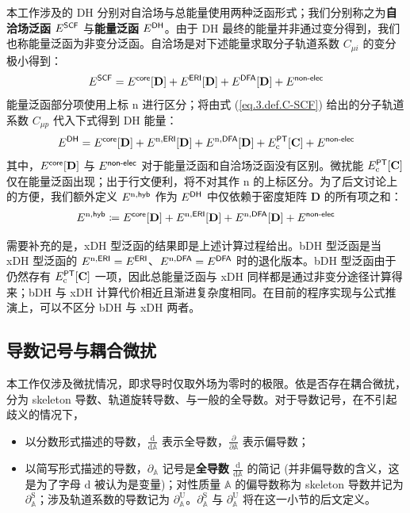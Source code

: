 本工作涉及的 DH 分别对自洽场与总能量使用两种泛函形式；我们分别称之为\textbf{自洽场泛函} $E^{\textsf{SCF}}$ 与\textbf{能量泛函} $E^{\textsf{DH}}$。由于 DH 最终的能量并非通过变分得到，我们也称能量泛函为非变分泛函。自洽场是对下述能量求取分子轨道系数 $C_{\mu i}$ 的变分极小得到：
\begin{equation}
    \label{eq.3.def.eng-SCF}
    E^{\textsf{SCF}} = E^{\textsf{core}} [\mathbf{D}] + E^{\textsf{ERI}} [\mathbf{D}] + E^{\textsf{DFA}} [\mathbf{D}] + E^{\textsf{non-elec}}
\end{equation}
能量泛函部分项使用上标 $\mathrm{n}$ 进行区分；将由式 (\ref{eq.3.def.C-SCF}) 给出的分子轨道系数 $C_{\mu p}$ 代入下式得到 DH 能量：
\begin{equation}
    \label{eq.3.def.eng-DH}
    E^{\textsf{DH}} = E^{\textsf{core}} [\mathbf{D}] + E^{\mathrm{n}, \textsf{ERI}} [\mathbf{D}] + E^{\mathrm{n}, \textsf{DFA}} [\mathbf{D}] + E_\mathrm{c}^{\textsf{PT}} [\mathbf{C}] + E^{\textsf{non-elec}}
\end{equation}
其中，$E^{\textsf{core}} [\mathbf{D}]$ 与 $E^{\textsf{non-elec}}$ 对于能量泛函和自洽场泛函没有区别。微扰能 $E_\mathrm{c}^{\textsf{PT}} [\mathbf{C}]$ 仅在能量泛函出现；出于行文便利，将不对其作 $\mathrm{n}$ 的上标区分。为了后文讨论上的方便，我们额外定义 $E^{\mathrm{n}, \textsf{hyb}}$ 作为 $E^{\textsf{DH}}$ 中仅依赖于密度矩阵 $\mathbf{D}$ 的所有项之和：
\begin{equation}
    \label{eq.3.def.eng-n-hyb}
    E^{\mathrm{n}, \textsf{hyb}} \coloneq E^{\textsf{core}} [\mathbf{D}] + E^{\mathrm{n}, \textsf{ERI}} [\mathbf{D}] + E^{\mathrm{n}, \textsf{DFA}} [\mathbf{D}] + E^{\textsf{non-elec}}
\end{equation}

需要补充的是，xDH 型泛函的结果即是上述计算过程给出。bDH 型泛函是当 xDH 型泛函的 $E^{\mathrm{n}, \textsf{ERI}} = E^{\textsf{ERI}}$、$E^{\mathrm{n}, \textsf{DFA}} = E^{\textsf{DFA}}$ 时的退化版本。bDH 型泛函由于仍然存有 $E_\mathrm{c}^{\textsf{PT}} [\mathbf{C}]$ 一项，因此总能量泛函与 xDH 同样都是通过非变分途径计算得来；bDH 与 xDH 计算代价相近且渐进复杂度相同。在目前的程序实现与公式推演上，可以不区分 bDH 与 xDH 两者。

\subsection{导数记号与耦合微扰}

本工作仅涉及微扰情况，即求导时仅取外场为零时的极限。依是否存在耦合微扰，分为 skeleton 导数、轨道旋转导数、与一般的全导数。对于导数记号，在不引起歧义的情况下，
\begin{itemize}[nosep]
    \item 以分数形式描述的导数，$\frac{\mathrm{d}}{\mathrm{d} \mathbb{A}}$ 表示全导数，$\frac{\partial}{\partial \mathbb{A}}$ 表示偏导数；
    \item 以简写形式描述的导数，$\partial_\mathbb{A}$ 记号是\textbf{全导数} $\frac{\mathrm{d}}{\mathrm{d} \mathbb{A}}$ 的简记 (并非偏导数的含义，这是为了字母 $\mathrm{d}$ 被认为是变量)；对性质量 $\mathbb{A}$ 的偏导数称为 skeleton 导数并记为 $\partial_\mathbb{A}^{\mathrm{S}}$；涉及轨道系数的导数记为 $\partial_\mathbb{A}^{\mathrm{U}}$。$\partial_\mathbb{A}^{\mathrm{S}}$ 与 $\partial_\mathbb{A}^{\mathrm{U}}$ 将在这一小节的后文定义。
\end{itemize}

